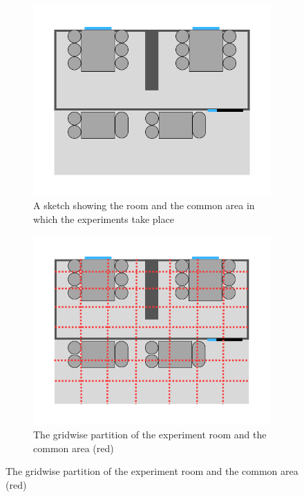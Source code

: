 \begin{figure}
    \centering
    \begin{subfigure}[b]{0.48\textwidth}
        \centering
        \includegraphics[width=\textwidth]{images/experiment_room.png}
        \caption{A sketch showing the room and the common area in which the experiments take place}
        \label{fig:experiment_room}
    \end{subfigure}
    \begin{subfigure}[b]{0.48\textwidth}
        \centering
        \includegraphics[width=\textwidth]{images/roomwithgrid.png}
        \caption{The gridwise partition of the experiment room and the common area (red)}

\end{subfigure}
\end{figure}
